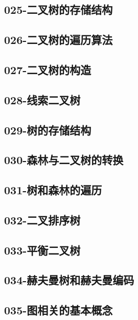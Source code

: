 \subsection{025-二叉树的存储结构}

\subsection{026-二叉树的遍历算法}

\subsection{027-二叉树的构造}

\subsection{028-线索二叉树}

\subsection{029-树的存储结构}

\subsection{030-森林与二叉树的转换}

\subsection{031-树和森林的遍历}

\subsection{032-二叉排序树}

\subsection{033-平衡二叉树}

\subsection{034-赫夫曼树和赫夫曼编码}

\subsection{035-图相关的基本概念}

